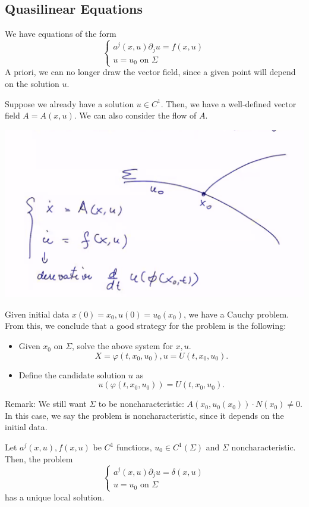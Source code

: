 \documentclass[12pt]{scrartcl}
\let \phi \varphi
\begin{document}
\subsection{Quasilinear Equations}
We have equations of the form
$$\begin{cases}
a^j(x, u)\partial_j u = f(x, u)\\
u = u_0 \text{ on } \Sigma
\end{cases}$$
A priori, we can no longer draw the vector field, since a given point will depend on the solution $u$.  

Suppose we already have a solution $u \in C^1$.  Then, we have a well-defined vector field $A = A(x, u)$.  We can also consider the flow of $A$.

 \begin{center}
\includegraphics[scale=0.6]{quasi.png}
\end{center}
Given initial data $x(0) = x_0, u(0) = u_0(x_0)$, we have a Cauchy problem.  From this, we conclude that a good strategy for the problem is the following:
\begin{itemize}
\item Given $x_0$ on $\Sigma$, solve the above system for $x, u$.  
$$X = \phi(t, x_0, u_0), u = U(t, x_0, u_0).$$
\item Define the candidate solution $u$ as $$u(\phi(t, x_0, u_0)) = U(t, x_0, u_0).$$
\end{itemize}
Remark: We still want $\Sigma$ to be noncharacteristic: $A(x_0, u_0(x_0)) \cdot N(x_0) \ne 0$.  In this case, we say the problem is noncharacteristic, since it depends on the initial data.
\begin{thm} Let $a^j(x, u), f(x, u)$ be $C^1$ functions, $u_0 \in C^1(\Sigma)$ and $\Sigma$ noncharacteristic.  Then, the problem
$$\begin{cases}
a^j(x, u)\partial_j u = \delta(x, u)\\
u = u_0 \text{ on }\Sigma
\end{cases}$$
has a unique local solution.
\end{thm}
\end{document}
